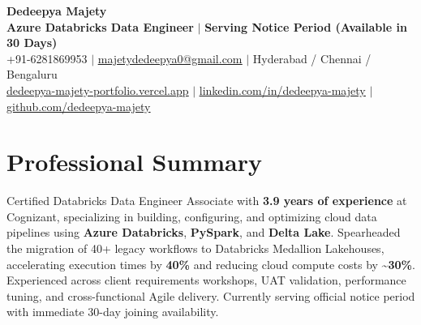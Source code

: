 \documentclass[letterpaper,10pt]{article}
\begin{document}
\begin{center}
    {\Huge \bfseries \color{primaryAccent} Dedeepya Majety} \\ \vspace{2pt}
    \textbf{Azure Databricks Data Engineer} $\vert$ \textbf{Serving Notice Period (Available in 30 Days)} \\ \vspace{2pt}
    \small +91-6281869953 $\vert$ \href{mailto:majetydedeepya0@gmail.com}{\underline{majetydedeepya0@gmail.com}} $\vert$ Hyderabad / Chennai / Bengaluru \\ \vspace{1.5pt}
    \href{https://dedeepya-majety-portfolio.vercel.app}{\underline{dedeepya-majety-portfolio.vercel.app}} $\vert$ \href{https://linkedin.com/in/dedeepya-majety}{\underline{linkedin.com/in/dedeepya-majety}} $\vert$ \href{https://github.com/dedeepya-majety}{\underline{github.com/dedeepya-majety}}
\end{center}
\vspace{-8pt}

\section{Professional Summary}
\small{
Certified Databricks Data Engineer Associate with \textbf{3.9 years of experience} at Cognizant, specializing in building, configuring, and optimizing cloud data pipelines using \textbf{Azure Databricks}, \textbf{PySpark}, and \textbf{Delta Lake}. Spearheaded the migration of 40+ legacy workflows to Databricks Medallion Lakehouses, accelerating execution times by \textbf{40\%} and reducing cloud compute costs by \textbf{\textasciitilde30\%}. Experienced across client requirements workshops, UAT validation, performance tuning, and cross-functional Agile delivery. Currently serving official notice period with immediate 30-day joining availability.
}
\vspace{-2pt}

\end{document}
